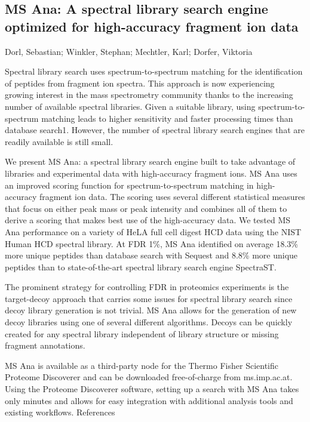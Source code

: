 {\subsection*{\color{eubicRed} MS Ana: A spectral library search engine optimized for high-accuracy fragment ion data}
{\color{eubicGray}Dorl, Sebastian;
Winkler, Stephan;
Mechtler, Karl;
Dorfer, Viktoria}

Spectral library search uses spectrum-to-spectrum matching for the identification of peptides from fragment ion spectra. This approach is now experiencing growing interest in the mass spectrometry community thanks to the increasing number of available spectral libraries. Given a suitable library, using spectrum-to-spectrum matching leads to higher sensitivity and faster processing times than database search1. However, the number of spectral library search engines that are readily available is still small.

We present MS Ana: a spectral library search engine built to take advantage of libraries and experimental data with high-accuracy fragment ions. MS Ana uses an improved scoring function for spectrum-to-spectrum matching in high-accuracy fragment ion data. The scoring uses several different statistical measures that focus on either peak mass or peak intensity and combines all of them to derive a scoring that makes best use of the high-accuracy data. We tested MS Ana performance on a variety of HeLA full cell digest HCD data using the NIST Human HCD spectral library. At FDR 1\%, MS Ana identified on average 18.3\% more unique peptides than database search with Sequest and 8.8\% more unique peptides than to state-of-the-art spectral library search engine SpectraST.

The prominent strategy for controlling FDR in proteomics experiments is the target-decoy approach that carries some issues for spectral library search since decoy library generation is not trivial. MS Ana allows for the generation of new decoy libraries using one of several different algorithms. Decoys can be quickly created for any spectral library independent of library structure or missing fragment annotations.

MS Ana is available as a third-party node for the Thermo Fisher Scientific Proteome Discoverer and can be downloaded free-of-charge from ms.imp.ac.at. Using the Proteome Discoverer software, setting up a search with MS Ana takes only minutes and allows for easy integration with additional analysis tools and existing workflows.
References

}
